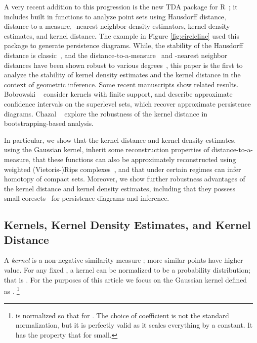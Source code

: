 \documentclass[11pt]{myclass}
\begin{document}
A very recent addition to this progression is the new TDA package for R~\cite{FKLM14}; it includes built in functions to analyze point sets using Hausdorff distance, distance-to-a-measure, -nearest neighbor density estimators, kernel density estimates, and kernel distance.  The example in Figure \ref{fig:circleline} used this package to generate persistence diagrams.  
While, the stability of the Hausdorff distance is classic~\cite{CC12,Edelsbrunner1993}, and the distance-to-a-measure~\cite{ChazalCohen-SteinerMerigot2011} and -nearest neighbor distances have been shown robust to various degrees~\cite{BCCSDR11}, this paper is the first to analyze the stability of kernel density estimates and the kernel distance in the context of geometric inference.
Some recent manuscripts show related results.  
Bobrowski \etal~\cite{BMT14} consider kernels with finite support, and describe approximate confidence intervals on the superlevel sets, which recover approximate persistence diagrams.  
Chazal \etal~\cite{CFLMRW14} explore the robustness of the kernel distance in bootstrapping-based analysis.

In particular, we show that the kernel distance and kernel density estimates, using the Gaussian kernel, inherit some reconstruction properties of distance-to-a-measure, that these functions can also be approximately reconstructed using weighted (Vietoris-)Rips complexes~\cite{BuchetChazalOudot2013}, and that under certain regimes can infer homotopy of compact sets.  
Moreover, we show further robustness advantages of the kernel distance and kernel density estimates, including that they possess small coresets~\cite{Phillips2013,big-kde} for persistence diagrams and inference.  

\vspace{-.1in}










\subsection{Kernels, Kernel Density Estimates, and Kernel Distance}
\label{sec:kernel}
A \emph{kernel} is a non-negative similarity measure ; more similar points have higher value.  For any fixed , a kernel  can be normalized to be a probability distribution; that is .  
For the purposes of this article we focus on the Gaussian kernel defined as 
. \footnote{
 is normalized so that  for .  
The choice of coefficient  is not the standard normalization, but it is perfectly valid as it scales everything by a constant.  It has the property that  for  small.}
\end{document}

